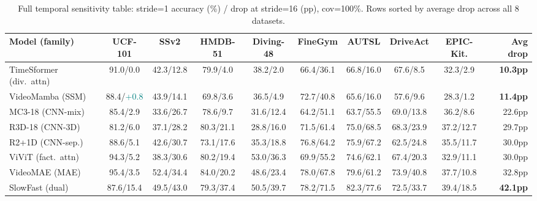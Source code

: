 \documentclass[runningheads]{llncs}
\newcommand{\tabtight}{\setlength{\tabcolsep}{3.5pt}\renewcommand{\arraystretch}{1.10}}
\newcommand{\rev}[1]{\textcolor{revblue}{#1}}
\newcommand{\revdel}[1]{}
\begin{document}
\begin{table}[t]
\centering
\caption{Full temporal \rev{sensitivity} table: stride=1 accuracy (\%) / drop at stride=16 (pp), cov=100\%. Rows sorted by average drop across all 8 datasets.}
\label{tab:e1_full}
\scriptsize\tabtight
\begin{adjustbox}{max width=\textwidth}
\begin{tabular}{l @{\hskip4pt} cccccccc @{\hskip4pt} r}
\toprule
Model (family) & UCF-101 & SSv2 & HMDB-51 & Diving-48 & FineGym & AUTSL & DriveAct & EPIC-Kit. & Avg drop \\
\midrule
TimeSformer (div.\ attn) & 91.0/0.0 & 42.3/12.8 & 79.9/4.0 & 38.2/2.0 & 66.4/36.1 & 66.8/16.0 & 67.6/8.5 & 32.3/2.9 & \textbf{10.3pp} \\
VideoMamba (SSM)         & 88.4/\textcolor{teal}{+0.8} & 43.9/14.1 & 69.8/3.6 & 36.5/4.9 & 72.7/40.8 & 65.6/16.0 & 57.6/9.6 & 28.3/1.2 & \textbf{11.4pp} \\
\midrule
MC3-18 (CNN-mix)  & 85.4/2.9  & 33.6/26.7 & 78.6/9.7  & 31.6/12.4 & 64.2/51.1 & 63.7/55.5 & 69.0/13.8 & 36.2/8.6  & 22.6pp \\
R3D-18 (CNN-3D)   & 81.2/6.0  & 37.1/28.2 & 80.3/21.1 & 28.8/16.0 & 71.5/61.4 & 75.0/68.5 & 68.3/23.9 & 37.2/12.7 & 29.7pp \\
R2+1D (CNN-sep.)  & 88.6/5.1  & 42.6/30.7 & 73.1/17.6 & 35.3/18.8 & 76.8/64.2 & 75.9/67.2 & 62.5/24.8 & 35.5/11.7 & 30.0pp \\
ViViT (fact.\ attn) & 94.3/5.2 & 38.3/30.6 & 80.2/19.4 & 53.0/36.3 & 69.9/55.2 & 74.6/62.1 & 67.4/20.3 & 32.9/11.1 & 30.0pp \\
VideoMAE (MAE)    & 95.4/3.5  & 52.4/34.4 & 84.0/20.2 & 48.6/23.4 & 78.0/67.8 & 79.6/61.2 & 73.9/40.8 & 37.7/10.8 & 32.8pp \\
SlowFast (dual)   & 87.6/15.4 & 49.5/43.0 & 79.3/37.4 & 50.5/39.7 & 78.2/71.5 & 82.3/77.6 & 72.5/33.7 & 39.4/18.5 & \textbf{42.1pp} \\
\bottomrule
\end{tabular}
\end{adjustbox}
\end{table}

\paragraph{\revdel{Architecture-specific failure modes.}}
\revdel{SlowFast cliffs at stride 2$\to$4 because its fast and slow pathways are simultaneously starved; on FineGym it has the best base accuracy (78.2\%) but the largest drop (71.5pp). VideoMAE is spatially strong but temporally fragile: masked patch reconstruction does not train robustness to missing frames. VideoMamba's failures concentrate on high-frequency phase changes, handshape transitions, and ordering-sensitive interactions.}
\end{document}
